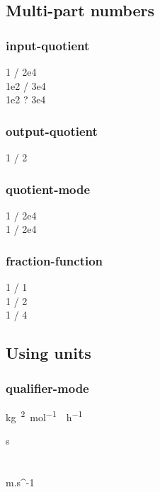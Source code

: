 \documentclass{article}
\begin{document}
\subsection{Multi-part numbers}
\subsubsection{input-quotient}
\num{ 1 / 2e4 } \\
\num{ 1e2 / 3e4 }\\
\num[input-quotient=?]{ 1e2 ? 3e4 }

\subsubsection{output-quotient}
\num[output-quotient = \text{ div }]{1 / 2}

\subsubsection{quotient-mode}
\num{1 / 2e4} \\
\num[quotient-mode = fraction]{1 / 2e4}

\subsubsection{fraction-function}
{
\num{1 / 1}\\
\num[fraction-function= \dfrac]{1 / 2}\\
\num[fraction-function= \tfrac]{1 / 4}
}

\setcounter{subsection}{11}
\subsection{Using units}
\subsubsection{qualifier-mode}
\si[qualifier-mode = phrase]
{\kilogram\polymer\squared\per\mole\catalyst\per\hour}

\begin{table}
\centering
\caption{Units in tables.}
\label{tab:s:demo}
\begin{tabular}{s}
\toprule
{} \\
\midrule
\metre\squared\per\second \\
\pascal \\
m.s^{-1} \\
\bottomrule
\end{tabular}
\end{table}
\end{document}
